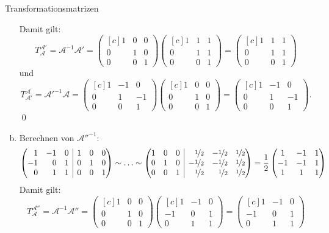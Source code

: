\documentclass[german]{../spicker}
\makeatletter
\newcommand{\vektor}[1]{\begin{pmatrix*}[c] #1 \end{pmatrix*}}
\newenvironment{sysmatrix}[1]
 {\left(\begin{array}{@{}#1@{}}}
 {\end{array}\right)}
\makeatother
\begin{document}
\begin{example}{Transformationsmatrizen}
\begin{enumerate}[a)]
              Damit gilt:
              $$
                  T^{\mathcal{A}'}_{\mathcal{A}} = \mathcal{A}^{-1}\mathcal{A}' = \vektor{1 & 0 & 0 \\ 0 & 1 & 0 \\ 0 & 0 & 1} \vektor{1 & 1 & 1 \\ 0 & 1 & 1 \\ 0 & 0 & 1} = \vektor{1 & 1 & 1 \\ 0 & 1 & 1 \\ 0 & 0 & 1}
              $$
              und
              $$
                  T^{\mathcal{A}}_{\mathcal{A}'} = \mathcal{A}'^{-1}\mathcal{A} = \vektor{1 & -1 & 0 \\ 0 & 1 & -1 \\ 0 & 0 & 1} \vektor{1 & 0 & 0 \\ 0 & 1 & 0 \\ 0 & 0 & 1} = \vektor{1 & -1 & 0 \\ 0 & 1 & -1 \\ 0 & 0 & 1}.
              $$\qed
        \item Berechnen von $\mathcal{A}''^{-1}$:
              $$
                  \begin{sysmatrix}{rrr|rrr}
                      1 & -1 & 0 & 1 & 0 & 0 \\
                      -1 & 0 & 1 & 0 & 1 & 0 \\
                      0 & 1 & 1 & 0 & 0 & 1
                  \end{sysmatrix}
                  \sim
                  \ldots
                  \sim
                  \begin{sysmatrix}{rrr|rrr}
                      1 & 0 & 0 & \nicefrac{1}{2} & -\nicefrac{1}{2} & \nicefrac{1}{2} \\
                      0 & 1 & 0 & -\nicefrac{1}{2} & -\nicefrac{1}{2} & \nicefrac{1}{2}\\
                      0 & 0 & 1 & \nicefrac{1}{2} & \nicefrac{1}{2} & \nicefrac{1}{2}
                  \end{sysmatrix}
                  =
                  \frac{1}{2}\vektor{1 & -1 & 1 \\ -1 & -1 & 1 \\ 1 & 1 & 1}
              $$
              Damit gilt:
              $$
                  T^{\mathcal{A}''}_{\mathcal{A}} = \mathcal{A}^{-1}\mathcal{A}'' = \vektor{1 & 0 & 0 \\ 0 & 1 & 0 \\ 0 & 0 & 1} \vektor{1 & -1 & 0 \\ -1 & 0 & 1 \\ 0 & 1 & 1} = \vektor{1 & -1 & 0 \\ -1 & 0 & 1 \\ 0 & 1 & 1}
$$
\end{enumerate}
\end{example}
\end{document}
